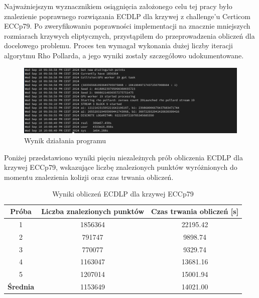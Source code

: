 Najważniejszym wyznacznikiem osiągnięcia założonego celu tej pracy było
znalezienie poprawnego rozwiązania ECDLP dla krzywej z challenge'u Certicom ECCp79.
Po zweryfikowaniu poprawności implementacji na znacznie mniejszych rozmiarach
krzywych eliptycznych, przystąpiłem do przeprowadzenia obliczeń dla docelowego
problemu. Proces ten wymagał wykonania dużej liczby iteracji algorytmu Rho Pollarda,
a jego wyniki zostały szczegółowo udokumentowane.

\begin{figure}[H]
    \centering
    \includegraphics[width=1\textwidth]{img/first_attempt.png}
    \caption{Wynik działania programu}
    \label{fig:first_attempt}
\end{figure}

Poniżej przedstawiono wyniki pięciu niezależnych prób obliczenia ECDLP dla
krzywej ECCp79, wskazujące liczbę znalezionych punktów wyróżnionych do momentu
znalezienia kolizji oraz czas trwania obliczeń.

\begin{table}[H]
    \centering
    \caption{Wyniki obliczeń ECDLP dla krzywej ECCp79}
    \label{tab:eccp79_results}
    \begin{tabular}{|c|c|c|}
        \hline
        \textbf{Próba}   & \textbf{Liczba znalezionych punktów} &
        \textbf{Czas trwania obliczeń [s]}                                      \\ \hline
        1                & 1856364                             & 22195.42      \\ \hline
        2                & 791747                              & 9898.74       \\ \hline
        3                & 770077                              & 9329.74       \\ \hline
        4                & 1163047                             & 13681.16      \\ \hline
        5                & 1207014                             & 15001.94      \\ \hline
        \textbf{Średnia} & 1153649                             & 14021.00      \\ \hline
    \end{tabular}
\end{table}



